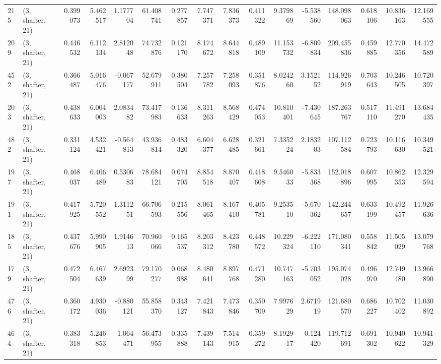 \begin{tabular}{llrrrrrrrrrrrrrr}
215 &  (3, shafter, 21) &   0.399073 &   5.462517 &   1.177704 &    61.408741 &   0.277857 &   7.747371 &   7.836373 &  0.411322 &   9.379869 &  -5.538560 &   148.098063 &  0.618106 &  10.836163 &  12.169555 \\
209 &  (3, shafter, 21) &   0.446532 &   6.112134 &   2.812048 &    74.732876 &   0.121170 &   8.174672 &   8.644818 &  0.489109 &  11.153732 &  -6.809834 &   209.455836 &  0.459885 &  12.770356 &  14.472589 \\
452 &  (3, shafter, 21) &   0.366487 &   5.016476 &  -0.067177 &    52.679911 &   0.380504 &   7.257782 &   7.258093 &  0.351876 &   8.024260 &   3.152152 &   114.926919 &  0.703643 &  10.246505 &  10.720397 \\
203 &  (3, shafter, 21) &   0.438633 &   6.004003 &   2.083482 &    73.417983 &   0.136633 &   8.311263 &   8.568429 &  0.474053 &  10.810401 &  -7.430645 &   187.263767 &  0.517110 &  11.491270 &  13.684435 \\
482 &  (3, shafter, 21) &   0.331124 &   4.532421 &  -0.564813 &    43.936814 &   0.483320 &   6.604377 &   6.628485 &  0.321661 &   7.335224 &   2.183203 &   107.112584 &  0.723793 &  10.116630 &  10.349521 \\
197 &  (3, shafter, 21) &   0.468037 &   6.406489 &   0.530683 &    78.684121 &   0.074705 &   8.854518 &   8.870407 &  0.418608 &   9.546033 &  -5.833368 &   152.018896 &  0.607995 &  10.862353 &  12.329594 \\
191 &  (3, shafter, 21) &   0.417925 &   5.720552 &   1.311251 &    66.706593 &   0.215556 &   8.061465 &   8.167410 &  0.405781 &   9.253510 &  -5.670362 &   142.244657 &  0.633199 &  10.492457 &  11.926636 \\
185 &  (3, shafter, 21) &   0.437676 &   5.990905 &   1.914613 &    70.960066 &   0.165537 &   8.203312 &   8.423780 &  0.448572 &  10.229324 &  -6.222110 &   171.080341 &  0.558842 &  11.505029 &  13.079768 \\
179 &  (3, shafter, 21) &   0.472504 &   6.467639 &   2.692399 &    79.170277 &   0.068988 &   8.480641 &   8.897768 &  0.471280 &  10.747163 &  -5.703052 &   195.074028 &  0.496970 &  12.749480 &  13.966890 \\
476 &  (3, shafter, 21) &   0.360172 &   4.930036 &  -0.880121 &    55.858370 &   0.343127 &   7.421843 &   7.473846 &  0.350709 &   7.997629 &   2.671919 &   121.680570 &  0.686227 &  10.702402 &  11.030892 \\
464 &  (3, shafter, 21) &   0.383318 &   5.246853 &  -1.064471 &    56.473955 &   0.335888 &   7.439143 &   7.514915 &  0.359272 &   8.192917 &  -0.124420 &   119.712691 &  0.691302 &  10.940622 &  10.941329 \\

\end{tabular}

